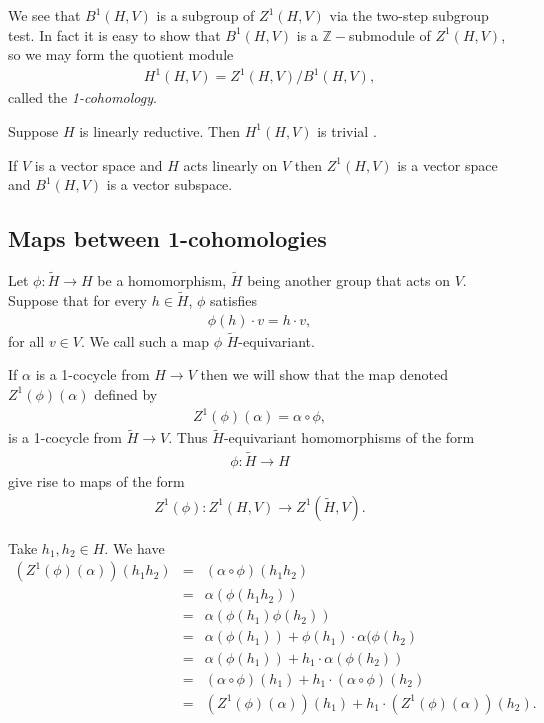 We see that $B^1(H, V)$ is a subgroup of $Z^1(H, V)$ via the two-step subgroup test. In fact it is easy to show that $B^1(H, V)$ is a $\mathbb{Z}-$submodule of $Z^1(H, V)$, so we may form the quotient module
\begin{eqnarray*}
	H^1\left(H, V\right) = Z^1\left(H, V\right) / B^1\left(H, V\right),
\end{eqnarray*}
called the \emph{1-cohomology}.
\begin{lemma} Suppose $H$ is linearly reductive. Then $H^1(H, V)$ is trivial \cite[Proposition 1]{kemper2000characterization}.
  \label{lem:lin_red_h}
\end{lemma}

\begin{example}
  If $V$ is a vector space and $H$ acts linearly on $V$ then $Z^1(H, V)$ is a vector space and $B^1(H, V)$ is a vector subspace.
\end{example}

\subsection{Maps between 1-cohomologies}
Let $\phi:\tilde{H}\rightarrow H$ be a homomorphism, $\tilde{H}$ being another group that acts on $V$. Suppose that for every $h \in \tilde{H}$, $\phi$ satisfies
\begin{eqnarray*}
	\phi(h)\cdot v = h\cdot v,
\end{eqnarray*}
for all $v \in V$. We call such a map $\phi$ $\tilde{H}$-equivariant. 

If $\alpha$ is a 1-cocycle from $H\rightarrow V$ then we will show that the map denoted $Z^1(\phi)(\alpha)$ defined by
\begin{eqnarray*}
	Z^1(\phi)(\alpha) = \alpha \circ \phi,
\end{eqnarray*}
is a 1-cocycle from $\tilde{H}\rightarrow V$. Thus $\tilde{H}$-equivariant homomorphisms of the form
\begin{eqnarray*}
	\phi:\tilde{H} \rightarrow H
\end{eqnarray*}
give rise to maps of the form
\begin{eqnarray*}
	Z^1(\phi):Z^1(H, V)\rightarrow Z^1(\tilde{H}, V).
\end{eqnarray*}

Take $h_1, h_2 \in H$. We have
\begin{eqnarray*}
	\left( Z^1(\phi)(\alpha) \right) (h_1h_2) &=& (\alpha \circ \phi)(h_1h_2) \\
		&=& \alpha(\phi(h_1h_2)) \\
		&=& \alpha(\phi(h_1)\phi(h_2)) \\
		&=& \alpha(\phi(h_1)) + \phi(h_1)\cdot\alpha(\phi(h_2) \\
		&=& \alpha(\phi(h_1)) + h_1\cdot\alpha(\phi(h_2)) \\
		&=& (\alpha \circ \phi)(h_1) + h_1 \cdot (\alpha \circ \phi)(h_2) \\
		&=& \left( Z^1(\phi)(\alpha) \right) (h_1) + h_1\cdot \left( Z^1(\phi)(\alpha) \right)(h_2).
\end{eqnarray*}

